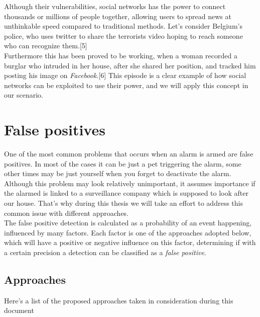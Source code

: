 Although their vulnerabilities, social networks has the power to connect thousands or millions of people together,
allowing users to spread news at unthinkable speed compared to traditional methods. Let's consider
Belgium's police, who uses twitter to share the terrorists video hoping to reach someone who
can recognize them.[5] \\
Furthermore this has been proved to be working, when a woman recorded a burglar
who intruded in her house, after she shared her position, and tracked him
posting his image on \textit{Facebook}.[6] This episode is a clear example
of how social networks can be exploited to use their power, and we
will apply this concept in our scenario.

\section{False positives}

One of the most common problems that occurs when an alarm
is armed are false positives. In most of the cases it can be just a pet
triggering the alarm, some other times may be just yourself when you forget to
deactivate the alarm.\\
Although this problem may look relatively unimportant, it assumes importance if the
alarmed is linked to a surveillance company which is supposed to look after our house.
That's why during this thesis we will take an effort to address this common issue with different
approaches.\\
The false positive detection is calculated as a probability of an event happening, influenced
by many factors. Each factor is one of the approaches adopted below, which will have a positive or
negative influence on this factor, determining if with a certain precision a detection can be classified
as a \textit{false positive}.

\subsection{Approaches}
Here's a list of the proposed approaches taken in consideration during this document


